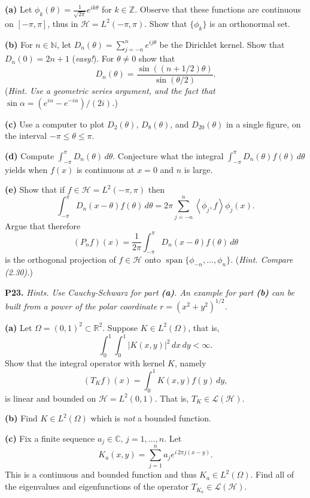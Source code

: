 \documentclass[12pt]{amsart}
\newcommand{\cH}{\mathcal{H}}
\newcommand{\cL}{\mathcal{L}}
\newcommand{\CC}{\mathbb{C}}
\newcommand{\NN}{\mathbb{N}}
\newcommand{\RR}{\mathbb{R}}
\newcommand{\ZZ}{\mathbb{Z}}
\newcommand{\ip}[2]{\ensuremath{\left<#1,#2\right>}}
\newcommand{\Span}{\operatorname{span}}
\newcommand{\prob}[1]{\bigskip\noindent\textbf{#1.}\quad }
\newcommand{\epart}[1]{\medskip\noindent\textbf{(#1)}\quad }
\newcommand{\ds}{\displaystyle}
\begin{document}
\epart{a}  Let $\ds \phi_k(\theta) = \frac{1}{\sqrt{2 \pi}} e^{ik\theta}$ for $k\in\ZZ$.  Observe that these functions are continuous on $[-\pi,\pi]$, thus in $\cH=L^2(-\pi,\pi)$.  Show that $\{\phi_k\}$ is an orthonormal set.

\epart{b}  For $n\in\NN$, let $\ds D_n(\theta) = \sum_{j=-n}^n e^{ij\theta}$ be the Dirichlet kernel.  Show that $D_n(0)=2n+1$ (\emph{easy!}).  For $\theta\ne 0$ show that
	$$D_n(\theta) = \frac{\sin\left((n+1/2)\theta\right)}{\sin(\theta/2)}.$$
(\emph{Hint.  Use a geometric series argument, and the fact that $\sin \alpha = (e^{i\alpha} - e^{-i\alpha})/(2i)$.})

\epart{c}  Use a computer to plot $D_2(\theta)$, $D_8(\theta)$, and $D_{20}(\theta)$ in a single figure, on the interval $-\pi \le \theta \le \pi$.

\epart{d}  Compute $\ds \int_{-\pi}^\pi D_n(\theta)\,d\theta$.  Conjecture what the integral $\ds \int_{-\pi}^\pi D_n(\theta) f(\theta)\,d\theta$ yields when $f(x)$ is continuous at $x=0$ and $n$ is large.

\epart{e}  Show that if $f\in\cH=L^2(-\pi,\pi)$ then
	$$\int_{-\pi}^\pi D_n(x-\theta) f(\theta)\,d\theta = 2\pi \sum_{j=-n}^n \ip{\phi_j}{f} \phi_j(x).$$
Argue that therefore
	$$(P_n f)(x) = \frac{1}{2\pi} \int_{-\pi}^\pi D_n(x-\theta) f(\theta)\,d\theta$$
is the orthogonal projection of $f \in \cH$ onto $\Span\{\phi_{-n},\dots,\phi_n\}$.  (\emph{Hint. Compare (2.30).})


\prob{P23}  \emph{Hints.  Use Cauchy-Schwarz for part \emph{\textbf{(a)}}.  An example for part \emph{\textbf{(b)}} can be built from a power of the polar coordinate $r=(x^2+y^2)^{1/2}$.}

\epart{a}  Let $\Omega=(0,1)^2 \subset \RR^2$.  Suppose $K \in L^2(\Omega)$, that is,
	$$\int_0^1 \int_0^1 |K(x,y)|^2\,dx\,dy < \infty.$$
Show that the integral operator with kernel $K$, namely
	$$(T_K f)(x) = \int_0^1 K(x,y) f(y)\,dy,$$
is linear and bounded on $\cH = L^2(0,1)$.  That is, $T_K \in\cL(\cH)$.

\epart{b} Find $K \in L^2(\Omega)$ which is \emph{not} a bounded function.

\epart{c} Fix a finite sequence $a_j\in\CC$, $j=1,\dots,n$.  Let
    $$K_{a}(x,y) = \sum_{j=1}^n a_j e^{i \,2\pi j(x-y)}.$$
This is a continuous and bounded function and thus $K_a \in L^2(\Omega)$.  Find all of the eigenvalues and eigenfunctions of the operator $T_{K_a} \in \cL(\cH)$.
\end{document}
